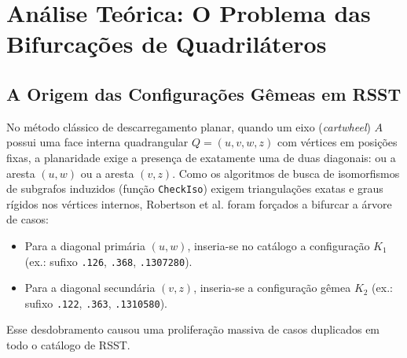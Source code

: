 \documentclass[11pt,a4paper]{article}
\begin{document}
\begin{table}[h!]
\centering
{}
\caption{Taxonomia e distribuição quantitativa das 165 configurações eliminadas.}
\end{table}

\section{Análise Teórica: O Problema das Bifurcações de Quadriláteros}

\subsection{A Origem das Configurações Gêmeas em RSST}
No método clássico de descarregamento planar, quando um eixo (\emph{cartwheel}) $A$ possui uma face interna quadrangular $Q = (u, v, w, z)$ com vértices em posições fixas, a planaridade exige a presença de exatamente uma de duas diagonais: ou a aresta $(u, w)$ ou a aresta $(v, z)$. Como os algoritmos de busca de isomorfismos de subgrafos induzidos (função \texttt{CheckIso}) exigem triangulações exatas e graus rígidos nos vértices internos, Robertson et al. foram forçados a bifurcar a árvore de casos:
\begin{itemize}
    \item Para a diagonal primária $(u, w)$, inseria-se no catálogo a configuração $K_1$ (ex.: sufixo \texttt{.126}, \texttt{.368}, \texttt{.1307280}).
    \item Para a diagonal secundária $(v, z)$, inseria-se a configuração gêmea $K_2$ (ex.: sufixo \texttt{.122}, \texttt{.363}, \texttt{.1310580}).
\end{itemize}
Esse desdobramento causou uma proliferação massiva de casos duplicados em todo o catálogo de RSST.
\end{document}
